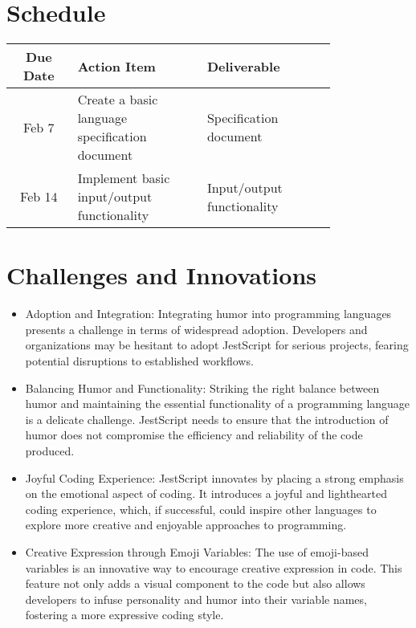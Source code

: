\documentclass[11pt,onecolumn]{sjsucs-proposal}
\begin{document}
\section{Schedule}
\begin{table}[h!]
  \begin{center}
    \label{tab:table1}
    \begin{tabular}{c|p{0.4\linewidth}|p{0.4\linewidth}}
      \hline
      \textbf{Due Date} & \textbf{Action Item} & \textbf{Deliverable}\\
      \hline
      Feb 7 & Create a basic language specification document & Specification document\\ 
      Feb 14 & Implement basic input/output functionality & Input/output functionality\\
      \hline
    \end{tabular}
  \end{center}
\end{table}



\section{Challenges and Innovations}
\begin{itemize}
  \item Adoption and Integration: Integrating humor into programming languages presents a challenge in terms of widespread adoption. Developers and organizations may be hesitant to adopt JestScript for serious projects, fearing potential disruptions to established workflows.
  \item Balancing Humor and Functionality: Striking the right balance between humor and maintaining the essential functionality of a programming language is a delicate challenge. JestScript needs to ensure that the introduction of humor does not compromise the efficiency and reliability of the code produced.
  \item Joyful Coding Experience: JestScript innovates by placing a strong emphasis on the emotional aspect of coding. It introduces a joyful and lighthearted coding experience, which, if successful, could inspire other languages to explore more creative and enjoyable approaches to programming.
  \item Creative Expression through Emoji Variables: The use of emoji-based variables is an innovative way to encourage creative expression in code. This feature not only adds a visual component to the code but also allows developers to infuse personality and humor into their variable names, fostering a more expressive coding style.
\end{itemize}

\nocite{*} %


\end{document}
